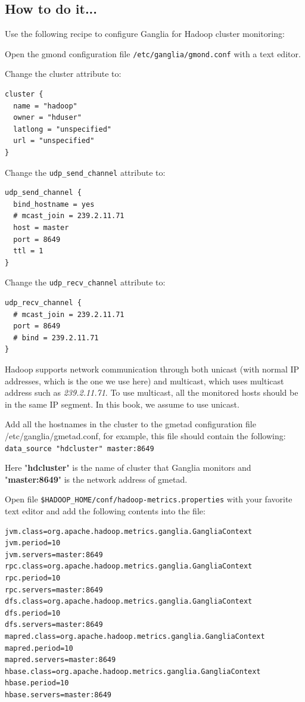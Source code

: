 \subsection*{How to do it...}
 Use the following recipe to configure Ganglia for Hadoop cluster monitoring:

Open the gmond configuration file \verb|/etc/ganglia/gmond.conf| with a text editor.

Change the cluster attribute to:
\lstset{style=bashstyle}
\begin{lstlisting}
cluster {
  name = "hadoop"
  owner = "hduser"
  latlong = "unspecified"
  url = "unspecified"
}
\end{lstlisting}

Change the \verb|udp_send_channel| attribute to: 
\lstset{style=bashstyle}
\begin{lstlisting}
udp_send_channel {
  bind_hostname = yes
  # mcast_join = 239.2.11.71
  host = master
  port = 8649
  ttl = 1
}
\end{lstlisting}

Change the \verb|udp_recv_channel| attribute to: 
\lstset{style=bashstyle}
\begin{lstlisting}
udp_recv_channel {
  # mcast_join = 239.2.11.71
  port = 8649
  # bind = 239.2.11.71
}
\end{lstlisting}

Hadoop supports network communication through both unicast (with normal IP addresses, which is the one we use here) and multicast, which uses multicast address such as \emph{239.2.11.71}. To use multicast, all the monitored hosts should be in the same IP segment. In this book, we assume to use unicast.

Add all the hostnames in the cluster to the gmetad configuration file /etc/ganglia/gmetad.conf, for example, this file should contain the following: \\
\verb|data_source "hdcluster" master:8649|

Here "\textbf{hdcluster}" is the name of cluster that Ganglia monitors and "\textbf{master:8649}" is the network address of gmetad.

Open file \verb|$HADOOP_HOME/conf/hadoop-metrics.properties| with your favorite text editor and add the following contents into the file:
\lstset{style=bashstyle}
\begin{lstlisting}
jvm.class=org.apache.hadoop.metrics.ganglia.GangliaContext
jvm.period=10
jvm.servers=master:8649
rpc.class=org.apache.hadoop.metrics.ganglia.GangliaContext
rpc.period=10
rpc.servers=master:8649
dfs.class=org.apache.hadoop.metrics.ganglia.GangliaContext
dfs.period=10
dfs.servers=master:8649
mapred.class=org.apache.hadoop.metrics.ganglia.GangliaContext
mapred.period=10
mapred.servers=master:8649
hbase.class=org.apache.hadoop.metrics.ganglia.GangliaContext
hbase.period=10
hbase.servers=master:8649
\end{lstlisting}

